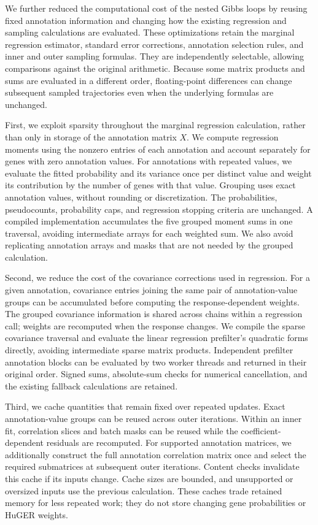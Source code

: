 \documentclass[11pt]{article}
\begin{document}
{We further reduced the computational cost of the nested Gibbs loops by
reusing fixed annotation information and changing how the existing
regression and sampling calculations are evaluated. These optimizations
retain the marginal regression estimator, standard error corrections,
annotation selection rules, and inner and outer sampling formulas. They
are independently selectable, allowing comparisons against the original
arithmetic. Because some matrix products and sums are evaluated in a
different order, floating-point differences can change subsequent sampled
trajectories even when the underlying formulas are unchanged.

First, we exploit sparsity throughout the marginal regression calculation,
rather than only in storage of the annotation matrix $X$. We compute
regression moments using the nonzero entries of each annotation and
account separately for genes with zero annotation values. For annotations
with repeated values, we evaluate the fitted probability and its variance
once per distinct value and weight its contribution by the number of
genes with that value. Grouping uses exact annotation values, without
rounding or discretization. The probabilities, pseudocounts, probability
caps, and regression stopping criteria are unchanged. A compiled
implementation accumulates the five grouped moment sums in one traversal,
avoiding intermediate arrays for each weighted sum. We also avoid
replicating annotation arrays and masks that are not needed by the grouped
calculation.

Second, we reduce the cost of the covariance corrections used in
regression. For a given annotation, covariance entries joining the same
pair of annotation-value groups can be accumulated before computing the
response-dependent weights. The grouped covariance information is shared
across chains within a regression call; weights are recomputed when the
response changes. We compile the sparse covariance traversal and evaluate
the linear regression prefilter's quadratic forms directly, avoiding
intermediate sparse matrix products. Independent prefilter annotation
blocks can be evaluated by two worker threads and returned in their
original order. Signed sums, absolute-sum checks for numerical
cancellation, and the existing fallback calculations are retained.

Third, we cache quantities that remain fixed over repeated updates. Exact
annotation-value groups can be reused across outer iterations. Within an
inner fit, correlation slices and batch masks can be reused while the
coefficient-dependent residuals are recomputed. For supported annotation
matrices, we additionally construct the full annotation correlation matrix
once and select the required submatrices at subsequent outer iterations.
Content checks invalidate this cache if its inputs change. Cache sizes
are bounded, and unsupported or oversized inputs use the previous
calculation. These caches trade retained memory for less repeated work;
they do not store changing gene probabilities or HuGER weights.

}
\end{document}
